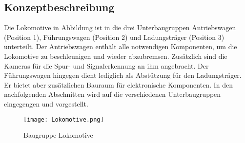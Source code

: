 \documentclass[../../main.tex]{subfiles}
\begin{document}
    \subsection{Konzeptbeschreibung}
    Die Lokomotive in Abbildung ist in die drei Unterbaugruppen Antriebswagen (Position 1), Führungswagen (Position 2) und Ladungsträger (Position 3) unterteilt. Der Antriebswagen enthält alle notwendigen Komponenten, um die Lokomotive zu beschleunigen und wieder abzubremsen. Zusätzlich sind die Kameras für die Spur- und Signalerkennung an ihm angebracht. Der Führungswagen hingegen dient lediglich als Abstützung für den Ladungsträger. Er bietet aber zusätzlichen Bauraum für elektronische Komponenten. In den nachfolgenden Abschnitten wird auf die verschiedenen Unterbaugruppen eingegengen und vorgestellt.

    \begin{figure}[H] %
        \centering
        \texttt{[image: Lokomotive.png]}
        \caption{Baugruppe Lokomotive}
        \label{fig:bg_lokomotive}
    \end{figure}
\end{document}
